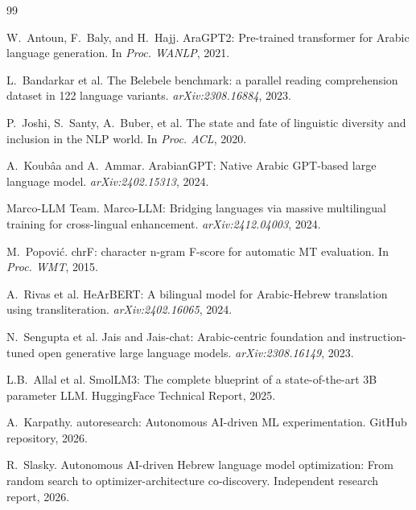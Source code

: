 \documentclass[10pt,twocolumn]{article}
\begin{document}

\begin{thebibliography}{99}

W.~Antoun, F.~Baly, and H.~Hajj.
\newblock AraGPT2: Pre-trained transformer for Arabic language generation.
\newblock In \emph{Proc. WANLP}, 2021.

L.~Bandarkar et al.
\newblock The Belebele benchmark: a parallel reading comprehension dataset in 122 language variants.
\newblock \emph{arXiv:2308.16884}, 2023.

P.~Joshi, S.~Santy, A.~Buber, et al.
\newblock The state and fate of linguistic diversity and inclusion in the NLP world.
\newblock In \emph{Proc. ACL}, 2020.

A.~Koub\^{a}a and A.~Ammar.
\newblock ArabianGPT: Native Arabic GPT-based large language model.
\newblock \emph{arXiv:2402.15313}, 2024.

Marco-LLM Team.
\newblock Marco-LLM: Bridging languages via massive multilingual training for cross-lingual enhancement.
\newblock \emph{arXiv:2412.04003}, 2024.

M.~Popovi\'{c}.
\newblock chrF: character n-gram F-score for automatic MT evaluation.
\newblock In \emph{Proc. WMT}, 2015.

A.~Rivas et al.
\newblock HeArBERT: A bilingual model for Arabic-Hebrew translation using transliteration.
\newblock \emph{arXiv:2402.16065}, 2024.

N.~Sengupta et al.
\newblock Jais and Jais-chat: Arabic-centric foundation and instruction-tuned open generative large language models.
\newblock \emph{arXiv:2308.16149}, 2023.

L.B.~Allal et al.
\newblock SmolLM3: The complete blueprint of a state-of-the-art 3B parameter LLM.
\newblock HuggingFace Technical Report, 2025.

A.~Karpathy.
\newblock autoresearch: Autonomous AI-driven ML experimentation.
\newblock GitHub repository, 2026.

R.~Slasky.
\newblock Autonomous AI-driven Hebrew language model optimization: From random search to optimizer-architecture co-discovery.
\newblock Independent research report, 2026.

\end{thebibliography}
\end{document}
